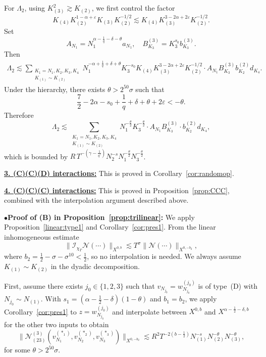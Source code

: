 \documentclass[11pt,reqno,english]{amsart}
\numberwithin{equation}{section}
\theoremstyle{plain}
\theoremstyle{definition}
\theoremstyle{remark}
\renewcommand{\epsilon}{\varepsilon}
\newcommand{\noi}{\noindent}
\begin{document}
For $\Lambda_2$, using $K_{(3)}^2\gtrsim K_{(2)}$, we first control the factor
\[
K_{(4)}K_{(2)}^{1-\alpha+\epsilon}K_{(3)}K_{(2)}^{-1/2}\lesssim K_{(4)}K_{(3)}^{3-2\alpha+2\epsilon}K_{(2)}^{-1/2}.
\]
Set
\[
A_{N_1}=N_1^{\alpha-\frac{1}{q}-\delta-\theta}a_{N_1},\quad B^{(3)}_{K_3}=K_3^{s_0}b_{K_3}^{(3)}.
\]
Then
\begin{align*}
	\Lambda_2\lesssim \sum_{\substack{K_1=N_1,K_2,K_3,K_4\\
			K_{(1)}\sim K_{(2)}}}
	N_1^{-\alpha+\frac{1}{q}+\delta+\theta}K_3^{-s_0}K_{(4)}K_{(3)}^{3-2\alpha+2\epsilon}K_{(2)}^{-1/2}\cdot
	A_{N_1}B_{K_3}^{(3)}b_{K_2}^{(2)}d_{K_4}.
\end{align*}
Under the hierarchy, there exists $\theta>2^{50}\sigma$ such that
\[
\frac{7}{2}-2\alpha-s_0+\frac{1}{q}+\delta+\theta+2\epsilon<-\theta.
\]
Therefore
\[
\Lambda_2\lesssim\sum_{\substack{K_1=N_1,K_2,K_3,K_4\\
		K_{(1)}\sim K_{(2)}
}} N_1^{-\frac{\theta}{2}}K_{3}^{-\frac{\theta}{2}}\cdot A_{N_1}B_{K_3}^{(3)}\cdot b_{K_2}^{(2)}d_{K_4},
\]
which is bounded by $R\, T^{-(\gamma-\frac{1}{q'})}N_2^{-s}N_1^{-\frac{\theta}{2}}N_3^{-\frac{\theta}{2}}$.


\medskip

\underline{\textbf{3. (C)(C)(D) interactions:}} This is proved in Corollary~\ref{cor:randomop}.


\medskip

\underline{\textbf{4. (C)(C)(C) interactions:}} This is proved in Proposition~\ref{prop:CCC}, combined with the interpolation argument described above.


\medskip


\noi
$\bullet${\bf Proof of (B) in Proposition~\ref{prop:trilinear}:} We apply Proposition~\ref{linear:type1} and
Corollary~\ref{cor:pres1}. From the linear inhomogeneous estimate
\[
\|\mathcal{I}_{\chi_T}\mathcal{N}(\cdots)\|_{X^{0,b}}\lesssim T^{\sigma}\|\mathcal{N}(\cdots)\|_{X^{0,-b_2}},
\]
where $b_2=\frac{1}{2}-\sigma-\sigma^{10}<\frac{1}{2}$, so no interpolation is needed. We always assume $K_{(1)}\sim K_{(2)}$ in the dyadic decomposition.

First, assume there exists $j_0\in\{1,2,3\}$ such that $v_{N_{j_0}}=w^{(j_0)}_{N_{j_0}}$ is of type~(D) with $N_{j_0}\sim N_{(1)}$. With $s_1=(\alpha-\frac{1}{2}-\delta)(1-\theta)$ and $b_1=b_2$, we
apply Corollary~\ref{cor:pres1} to $z=w_{N_{j_0}}^{(j_0)}$ and interpolate between $X^{0,b}$ and $X^{\alpha-\frac{1}{2}-\delta,b}$ for the other two inputs to obtain
\[
\|\mathcal{N}_{(23)}^{(3)}(v_{N_1}^{(\ast_1)},v_{N_2}^{(\ast_2)},v_{N_3}^{(\ast_3)})\|_{X^{0,-b_2}}\lesssim R^2 T^{-2(b-\frac{1}{2})}N_{(1)}^{-s}N_{(2)}^{-\theta}N_{(3)}^{-\theta},
\]
for some $\theta>2^{50}\sigma$.
\end{document}

